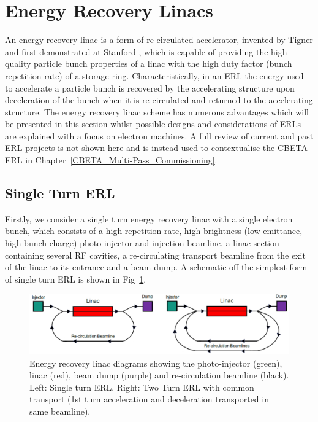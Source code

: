 \documentclass[../main.tex]{subfiles}
\begin{document}
\section{Energy Recovery Linacs}
\label{sec:ERL_theory}

An energy recovery linac is a form of re-circulated accelerator, invented by Tigner \cite{tigner1965possible} and first demonstrated at Stanford \cite{smith1987development}, which is capable of providing the high-quality particle bunch properties of a linac with the high duty factor (bunch repetition rate) of a storage ring. Characteristically, in an ERL the energy used to accelerate a particle bunch is recovered by the accelerating structure upon deceleration of the bunch when it is re-circulated and returned to the accelerating structure. The energy recovery linac scheme has numerous advantages which will be presented in this section whilst possible designs and considerations of ERLs are explained with a focus on electron machines. A full review of current and past ERL projects is not shown here and is instead used to contextualise the CBETA ERL in Chapter~\ref{CBETA_Multi-Pass_Commissioning}. 

\subsection{Single Turn ERL}
\label{sec:single_turn_ERL}

Firstly, we consider a single turn energy recovery linac with a single electron bunch, which consists of a high repetition rate, high-brightness (low emittance, high bunch charge) photo-injector \cite{ben2016superconducting} and injection beamline, a linac section containing several RF cavities, a re-circulating transport beamline from the exit of the linac to its entrance and a beam dump. A schematic off the simplest form of single turn ERL is shown in Fig~\ref{fig:ERL_schematics}. 

\begin{figure}[!h]
\centering
\includegraphics[width=\textwidth]{Figures/Energy_Recovery_Linac_Design/single_multi_turn_ERL.pdf}
\caption{Energy recovery linac diagrams showing the photo-injector (green), linac (red), beam dump (purple) and re-circulation beamline (black). Left: Single turn ERL. Right: Two Turn ERL with common transport (1st turn acceleration and deceleration transported in same beamline). }
\label{fig:ERL_schematics}
\end{figure}
\end{document}
